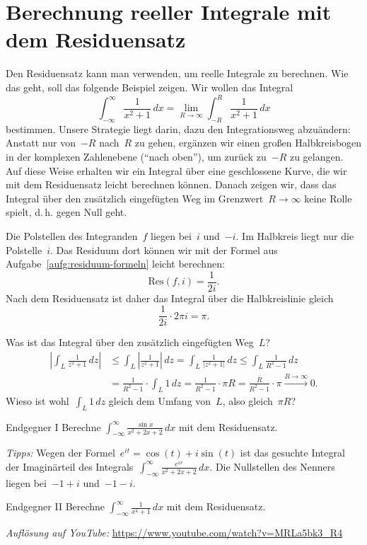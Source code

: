 \documentclass[twoside]{../zirkelblatt1415}
\theoremstyle{definition}
\theoremstyle{plain}
\theoremstyle{remark}
\newcommand{\Res}{\mathrm{Res}}
\begin{document}
\section{Berechnung reeller Integrale mit dem Residuensatz}

Den Residuensatz kann man verwenden, um reelle Integrale zu berechnen. Wie das
geht, soll das folgende Beispiel zeigen. Wir wollen das Integral
\[ \int_{-\infty}^\infty \frac{1}{x^2+1} \,dx = \lim_{R \to \infty} \int_{-R}^R
\frac{1}{x^2+1} \,dx \]
bestimmen. Unsere Strategie liegt darin, dazu den Integrationsweg abzuändern:
Anstatt nur von~$-R$ nach~$R$ zu gehen, ergänzen wir einen großen
Halbkreisbogen in der komplexen Zahlenebene ("`nach oben"'), um zurück zu~$-R$
zu gelangen. Auf diese Weise erhalten wir ein Integral über eine geschlossene
Kurve, die wir mit dem Residuensatz leicht berechnen können. Danach zeigen wir,
dass das Integral über den zusätzlich eingefügten Weg im Grenzwert~$R \to
\infty$ keine Rolle spielt, d.\,h. gegen Null geht.

Die Polstellen des Integranden~$f$ liegen bei~$i$ und~$-i$. Im Halbkreis liegt nur
die Polstelle~$i$. Das Residuum dort können wir mit der Formel aus
Aufgabe~\ref{aufg:residuum-formeln} leicht berechnen:
\[ \Res(f, i) = \frac{1}{2 i}. \]
Nach dem Residuensatz ist daher das Integral über die Halbkreislinie gleich
\[ \frac{1}{2 i} \cdot 2\pi i = \pi. \]

Was ist das Integral über den zusätzlich eingefügten Weg~$L$?
\begin{align*}
  \left|\int_L \frac{1}{z^2+1} \,dz\right| &\leq
  \int_L \left| \frac{1}{z^2+1} \right| \,dz
  = \int_L \frac{1}{|z^2+1|} \,dz
  \leq \int_L \frac{1}{R^2-1} \,dz \\[0.5em]
  &= \frac{1}{R^2 - 1} \cdot \int_L 1 \,dz
  = \frac{1}{R^2 - 1} \cdot \pi R
  = \frac{R}{R^2 - 1} \cdot \pi \xrightarrow{R \to \infty} 0.
\end{align*}
Wieso ist wohl~$\int_L 1 \,dz$ gleich dem Umfang von~$L$, also gleich~$\pi R$?

\thispagestyle{empty}
\enlargethispage{8em}


\begin{aufgabe}{Endgegner I}
Berechne $\int_{-\infty}^\infty \frac{\sin x}{x^2 + 2x + 2} \,dx$ mit dem Residuensatz.

\emph{Tipps:} Wegen der Formel~$e^{it} = \cos(t) + i \sin(t)$ ist das gesuchte
Integral der Imaginärteil des Integrals~$\int_{-\infty}^\infty
\frac{e^{ix}}{x^2 + 2x + 2} \,dx$. Die Nullstellen des Nenners liegen
bei~$-1+i$ und~$-1-i$.
\end{aufgabe}

\begin{aufgabe}{Endgegner II}
Berechne $\int_{-\infty}^\infty \frac{1}{x^4 + 1} \,dx$ mit dem Residuensatz.

\emph{Auflösung auf YouTube:} \url{https://www.youtube.com/watch?v=MRLa5bk3_R4}
\end{aufgabe}
\end{document}

